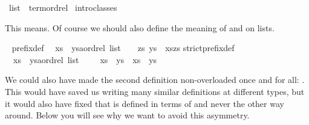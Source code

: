 %
\begin{isabellebody}%
\def\isabellecontext{Overloading}%
\ list\ {\isacharcolon}{\isacharcolon}\ {\isacharparenleft}{\isachardoublequote}term{\isachardoublequote}{\isacharparenright}ordrel\isanewline
{}\ intro{\isacharunderscore}classes%
\begin{isamarkuptext}%
\noindent
This means. Of course we should also define the meaning of \isa{{\isacharless}{\isacharless}{\isacharequal}} and
\isa{{\isacharless}{\isacharless}} on lists.%
\end{isamarkuptext}%
\ {\isacharparenleft}\isanewline
prefix{\isacharunderscore}def{\isacharcolon}\isanewline
\ \ {\isachardoublequote}xs\ {\isacharless}{\isacharless}{\isacharequal}\ {\isacharparenleft}ys{\isacharcolon}{\isacharcolon}{\isacharprime}a{\isacharcolon}{\isacharcolon}ordrel\ list{\isacharparenright}\ \ {\isasymequiv}\ \ {\isasymexists}zs{\isachardot}\ ys\ {\isacharequal}\ xs{\isacharat}zs{\isachardoublequote}\isanewline
strict{\isacharunderscore}prefix{\isacharunderscore}def{\isacharcolon}\isanewline
\ \ {\isachardoublequote}xs\ {\isacharless}{\isacharless}\ {\isacharparenleft}ys{\isacharcolon}{\isacharcolon}{\isacharprime}a{\isacharcolon}{\isacharcolon}ordrel\ list{\isacharparenright}\ \ \ {\isasymequiv}\ \ xs\ {\isacharless}{\isacharless}{\isacharequal}\ ys\ {\isasymand}\ xs\ {\isasymnoteq}\ ys{\isachardoublequote}%
\begin{isamarkuptext}%
We could also have made the second definition non-overloaded once and for
all: .  This would have saved us writing
many similar definitions at different types, but it would also have fixed
that \isa{{\isacharless}{\isacharless}} is defined in terms of \isa{{\isacharless}{\isacharless}{\isacharequal}} and never the other way
around. Below you will see why we want to avoid this asymmetry.%
\end{isamarkuptext}%
\end{isabellebody}%
